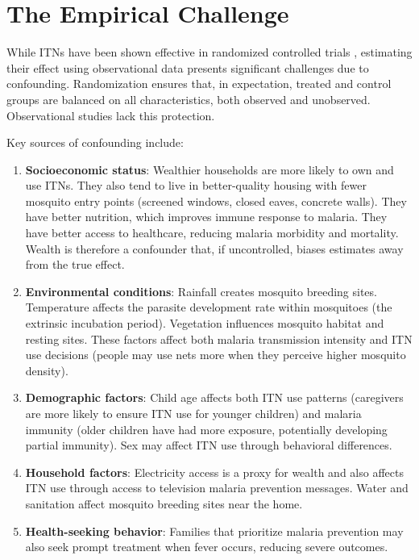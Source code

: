 \section{The Empirical Challenge}

While ITNs have been shown effective in randomized controlled trials \citep{lengeler2004insecticide, pryce2018insecticide}, estimating their effect using observational data presents significant challenges due to confounding. Randomization ensures that, in expectation, treated and control groups are balanced on all characteristics, both observed and unobserved. Observational studies lack this protection.

Key sources of confounding include:

\begin{enumerate}
	\item \textbf{Socioeconomic status}: Wealthier households are more likely to own and use ITNs. They also tend to live in better-quality housing with fewer mosquito entry points (screened windows, closed eaves, concrete walls). They have better nutrition, which improves immune response to malaria. They have better access to healthcare, reducing malaria morbidity and mortality. Wealth is therefore a confounder that, if uncontrolled, biases estimates away from the true effect.
	
	\item \textbf{Environmental conditions}: Rainfall creates mosquito breeding sites. Temperature affects the parasite development rate within mosquitoes (the extrinsic incubation period). Vegetation influences mosquito habitat and resting sites. These factors affect both malaria transmission intensity and ITN use decisions (people may use nets more when they perceive higher mosquito density).
	
	\item \textbf{Demographic factors}: Child age affects both ITN use patterns (caregivers are more likely to ensure ITN use for younger children) and malaria immunity (older children have had more exposure, potentially developing partial immunity). Sex may affect ITN use through behavioral differences.
	
	\item \textbf{Household factors}: Electricity access is a proxy for wealth and also affects ITN use through access to television malaria prevention messages. Water and sanitation affect mosquito breeding sites near the home.
	
	\item \textbf{Health-seeking behavior}: Families that prioritize malaria prevention may also seek prompt treatment when fever occurs, reducing severe outcomes.
\end{enumerate}

